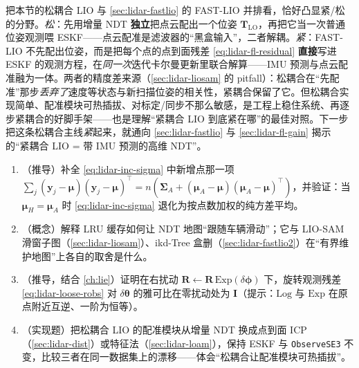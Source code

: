 \begin{insight}\label{ins:lidar-loose-vs-tight}
把本节的松耦合 LIO 与 \cref{sec:lidar-fastlio} 的 FAST-LIO 并排看，恰好凸显紧/松的分野。\emph{松}：先用增量 NDT \textbf{独立}把点云配出一个位姿 $\mathbf{T}_{\text{LO}}$，再把它当一次普通位姿观测喂 ESKF——点云配准是滤波器的“黑盒输入”，二者解耦。\emph{紧}：FAST-LIO 不先配出位姿，而是把每个点的点到面残差 \cref{eq:lidar-fl-residual} \textbf{直接}写进 ESKF 的观测方程，在\emph{同一次}迭代卡尔曼更新里联合解算——IMU 预测与点云配准融为一体。两者的精度差来源（\cref{sec:lidar-liosam} 的 pitfall）：松耦合在“先配准”那步\emph{丢弃了}速度等状态与新扫描位姿的相关性，紧耦合保留了它。但松耦合实现简单、配准模块可热插拔、对标定/同步不那么敏感，是工程上稳住系统、再逐步紧耦合的好脚手架——也是理解“紧耦合 LIO 到底紧在哪”的最佳对照。下一步把这条松耦合主线\emph{紧}起来，就通向 \cref{sec:lidar-fastlio} 与 \cref{sec:lidar-fl-gain} 揭示的“紧耦合 LIO = 带 IMU 预测的高维 NDT”。
\end{insight}

\begin{practice}
\begin{enumerate}
  \item （推导）补全 \cref{eq:lidar-inc-sigma} 中新增点那一项 $\sum_j(\mathbf{y}_j-\boldsymbol\mu)(\mathbf{y}_j-\boldsymbol\mu)^\top=n(\boldsymbol\Sigma_A+(\boldsymbol\mu_A-\boldsymbol\mu)(\boldsymbol\mu_A-\boldsymbol\mu)^\top)$，并验证：当 $\boldsymbol\mu_H=\boldsymbol\mu_A$ 时 \cref{eq:lidar-inc-sigma} 退化为按点数加权的纯方差平均。
  \item （概念）解释 LRU 缓存如何让 NDT 地图“跟随车辆滑动”；它与 LIO-SAM 滑窗子图（\cref{sec:lidar-liosam}）、ikd-Tree 盒删（\cref{sec:lidar-fastlio2}）在“有界维护地图”上各自的取舍是什么。
  \item （推导，结合 \cref{ch:lie}）证明在右扰动 $\mathbf{R}\leftarrow\mathbf{R}\,\mathrm{Exp}(\delta\boldsymbol\phi)$ 下，旋转观测残差 \cref{eq:lidar-loose-robs} 对 $\delta\boldsymbol\theta$ 的雅可比在零扰动处为 $\mathbf{I}$（提示：$\mathrm{Log}$ 与 $\mathrm{Exp}$ 在原点附近互逆、一阶为恒等）。
  \item （实现题）把松耦合 LIO 的配准模块从增量 NDT 换成点到面 ICP（\cref{sec:lidar-dist}）或特征法（\cref{sec:lidar-loam}），保持 ESKF 与 \texttt{ObserveSE3} 不变，比较三者在同一数据集上的漂移——体会“松耦合让配准模块可热插拔”。
\end{enumerate}
\end{practice}

